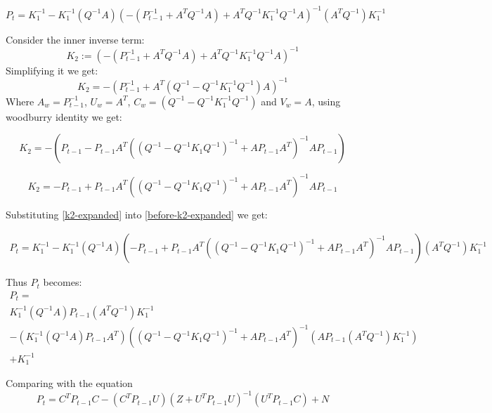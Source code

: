 \documentclass{tufte-handout}
\begin{document}
\begin{enumerate}[(a)]
  \begin{equation} 
    P_t = K_1^{-1}  - K_1^{-1} (Q^{-1}A) \left( -(P_{t-1}^{-1} + A^TQ^{-1}A) + A^TQ^{-1} K_1^{-1} Q^{-1}A \right)^{-1} (A^T Q^{-1}) K_1^{-1}
    \label{before-k2-expanded}
  \end{equation}

 Consider the inner inverse term:  
 \begin{equation}
     K_2 :=  (-(P_{t-1}^{-1} + A^TQ^{-1}A) + A^TQ^{-1} K_1^{-1} Q^{-1}A)^{-1} 
 \end{equation} 
  Simplifying it we get: 
  \begin{equation}
     K_2 =  -\left(P_{t-1}^{-1} + A^T(  Q^{-1} - Q^{-1} K_1^{-1} Q^{-1})A \right)^{-1} 
  \end{equation}
  Where $A_w = P_{t-1}^{-1}$, $U_w = A^T$, $C_w = (  Q^{-1} - Q^{-1} K_1^{-1} Q^{-1})$  and $V_w = A$, using woodburry identity we get: 

  \begin{equation} 
    K_2 = - \left( P_{t-1}  - P_{t-1}A^{T}( (Q^{-1} - Q^{-1}K_1 Q^{-1})^{-1} + A P_{t-1} A^T)^{-1}A P_{t-1}  \right)
  \end{equation}

  \begin{equation}
     K_2 =  -P_{t-1}  + P_{t-1}A^{T}( (Q^{-1} - Q^{-1}K_1 Q^{-1})^{-1} + A P_{t-1} A^T)^{-1}A P_{t-1}   
     \label{k2-expanded}
  \end{equation}

Substituting \ref{k2-expanded} into \ref{before-k2-expanded}  we get:

\begin{multline}
    P_t = K_1^{-1} - K_1^{-1} (Q^{-1}A) \left(-P_{t-1}  + P_{t-1}A^{T}( (Q^{-1} - Q^{-1}K_1 Q^{-1})^{-1} + A P_{t-1} A^T)^{-1}A P_{t-1}  \right) (A^T Q^{-1}) K_1^{-1}
\end{multline}

Thus $P_t$ becomes:
\begin{multline}
     P_t = \\ 
     K_1^{-1} (Q^{-1}A) P_{t-1} (A^T Q^{-1}) K_1^{-1}\\
   - (K_1^{-1} (Q^{-1}A)  
    P_{t-1}A^{T})( (Q^{-1} - Q^{-1}K_1 Q^{-1})^{-1} + A P_{t-1} A^T)^{-1} (A P_{t-1} (A^T Q^{-1}) K_1^{-1}) \\ 
    + K_1^{-1} 
\end{multline}

Comparing with the equation 
    \begin{equation*}
        P_t = C^TP_{t-1}C - (C^T P_{t-1}U)(Z + U^TP_{t-1}U)^{-1}(U^TP_{t-1}C) + N
    \end{equation*}


\end{enumerate}
\end{document}
